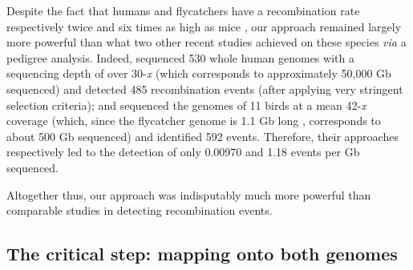 Despite the fact that humans and flycatchers have a recombination rate respectively twice and six times as high as mice \citep{kawakami2014highdensity,kawakami2017wholegenome}, our approach remained largely more powerful than what two other recent studies achieved on these species \textit{via} a pedigree analysis.
Indeed, \citet{halldorsson2016rate} sequenced 530 whole human genomes with a sequencing depth of over 30-\textit{x} (which corresponds to approximately 50,000 Gb sequenced) and detected 485 recombination events (after applying very stringent selection criteria); 
and \citet{smeds2016highresolution} sequenced the genomes of 11 birds at a mean 42-\textit{x} coverage (which, since the flycatcher genome is 1.1 Gb long \citep{ellegren2012genomic}, corresponds to about 500 Gb sequenced) and identified 592 events.
Therefore, their approaches respectively led to the detection of only 0.00970 and 1.18 events per Gb sequenced.

Altogether thus, our approach was indisputably much more powerful than comparable studies in detecting recombination events.

%




\subsection{The critical step: mapping onto both genomes}


